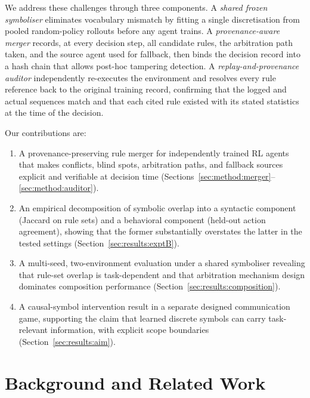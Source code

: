 \documentclass[12pt]{article}
\begin{document}
We address these challenges through three components.
A \emph{shared frozen symboliser} eliminates vocabulary mismatch by fitting
a single discretisation from pooled random-policy rollouts before any agent
trains.
A \emph{provenance-aware merger} records, at every decision step, all
candidate rules, the arbitration path taken, and the source agent used for
fallback, then binds the decision record into a hash chain that allows
post-hoc tampering detection.
A \emph{replay-and-provenance auditor} independently re-executes the
environment and resolves every rule reference back to the original training
record, confirming that the logged and actual sequences match and that each
cited rule existed with its stated statistics at the time of the decision.

Our contributions are:
\begin{enumerate}
\item A provenance-preserving rule merger for independently trained RL agents
  that makes conflicts, blind spots, arbitration paths, and fallback sources
  explicit and verifiable at decision time
  (Sections~\ref{sec:method:merger}--\ref{sec:method:auditor}).
\item An empirical decomposition of symbolic overlap into a syntactic
  component (Jaccard on rule sets) and a behavioral component (held-out
  action agreement), showing that the former substantially overstates the
  latter in the tested settings
  (Section~\ref{sec:results:exptB}).
\item A multi-seed, two-environment evaluation under a shared symboliser
  revealing that rule-set overlap is task-dependent and that arbitration
  mechanism design dominates composition performance
  (Section~\ref{sec:results:composition}).
\item A causal-symbol intervention result in a separate designed communication
  game, supporting the claim that learned discrete symbols can carry
  task-relevant information, with explicit scope boundaries
  (Section~\ref{sec:results:aim}).
\end{enumerate}

\section{Background and Related Work}
\label{sec:related}
\end{document}
